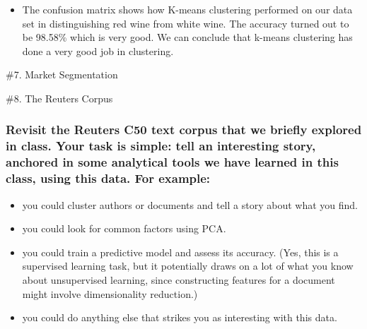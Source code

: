 \documentclass[
  12pt,
]{article}
\providecommand{\tightlist}{%
  \setlength{\itemsep}{0pt}\setlength{\parskip}{0pt}}
\begin{document}
\begin{itemize}
\tightlist
\item
  The confusion matrix shows how K-means clustering performed on our
  data set in distinguishing red wine from white wine. The accuracy
  turned out to be 98.58\% which is very good. We can conclude that
  k-means clustering has done a very good job in clustering.
\end{itemize}

\nextpage

\#7. Market Segmentation

\nextpage

\#8. The Reuters Corpus

\hypertarget{revisit-the-reuters-c50-text-corpus-that-we-briefly-explored-in-class.-your-task-is-simple-tell-an-interesting-story-anchored-in-some-analytical-tools-we-have-learned-in-this-class-using-this-data.-for-example}{%
\subsubsection{Revisit the Reuters C50 text corpus that we briefly
explored in class. Your task is simple: tell an interesting story,
anchored in some analytical tools we have learned in this class, using
this data. For
example:}\label{revisit-the-reuters-c50-text-corpus-that-we-briefly-explored-in-class.-your-task-is-simple-tell-an-interesting-story-anchored-in-some-analytical-tools-we-have-learned-in-this-class-using-this-data.-for-example}}

\begin{itemize}
\item
  you could cluster authors or documents and tell a story about what you
  find.
\item
  you could look for common factors using PCA.
\item
  you could train a predictive model and assess its accuracy. (Yes, this
  is a supervised learning task, but it potentially draws on a lot of
  what you know about unsupervised learning, since constructing features
  for a document might involve dimensionality reduction.)
\item
  you could do anything else that strikes you as interesting with this
  data.
\end{itemize}
\end{document}
